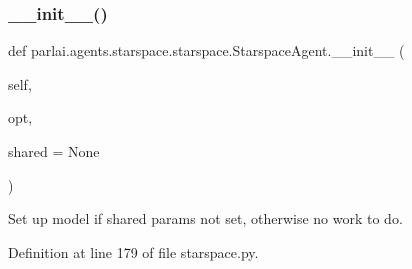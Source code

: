 \subsubsection{\texorpdfstring{\+\_\+\+\_\+init\+\_\+\+\_\+()}{\_\_init\_\_()}}
{\footnotesize\ttfamily def parlai.\+agents.\+starspace.\+starspace.\+Starspace\+Agent.\+\_\+\+\_\+init\+\_\+\+\_\+ (\begin{DoxyParamCaption}\item[{}]{self,  }\item[{}]{opt,  }\item[{}]{shared = {\ttfamily None} }\end{DoxyParamCaption})}

\begin{DoxyVerb}Set up model if shared params not set, otherwise no work to do.
\end{DoxyVerb}
 

Definition at line 179 of file starspace.\+py.


